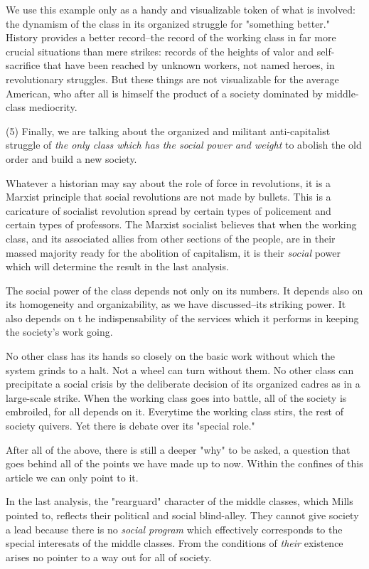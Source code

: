We use this example only as a handy and visualizable token of what is involved: the dynamism of the class in its organized struggle for "something better." History provides a better record--the record of the working class in far more crucial situations than mere strikes: records of the heights of valor and self-sacrifice that have been reached by unknown workers, not named heroes, in revolutionary struggles. But these things are not visualizable for the average American, who after all is himself the product of a society dominated by middle-class mediocrity.

(5) Finally, we are talking about the organized and militant anti-capitalist struggle of \emph{the only class which has the social power and weight} to abolish the old order and build a new society.

Whatever a historian may say about the role of force in revolutions, it is a Marxist principle that social revolutions are not made by bullets. This is a caricature of socialist revolution spread by certain types of policement and certain types of professors. The Marxist socialist believes that when the working class, and its associated allies from other sections of the people, are in their massed majority ready for the abolition of capitalism, it is their \emph{social} power which will determine the result in the last analysis.

The social power of the class depends not only on its numbers. It depends also on its homogeneity and organizability, as we have discussed--its striking power. It also depends on t he indispensability of the services which it performs in keeping the society's work going.

No other class has its hands so closely on the basic work without which the system grinds to a halt. Not a wheel can turn without them. No other class can precipitate a social crisis by the deliberate decision of its organized cadres as in a large-scale strike. When the working class goes into battle, all of the society is embroiled, for all depends on it. Everytime the working class stirs, the rest of society quivers. Yet there is debate over its "special role."

After all of the above, there is still a deeper "why" to be asked, a question that goes behind all of the points we have made up to now. Within the confines of this article we can only point to it.

In the last analysis, the "rearguard" character of the middle classes, which Mills pointed to, reflects their political and social blind-alley. They cannot give society a lead because there is no \emph{social program} which effectively corresponds to the special interesats of the middle classes. From the conditions of \emph{their} existence arises no pointer to a way out for all of society.


